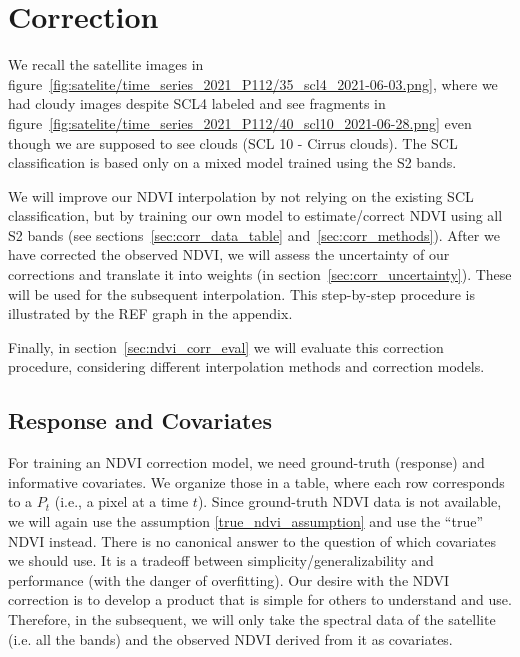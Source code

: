 \section{Correction}{
    \label{sec:corr_correction}
    {
        We recall the satellite images in figure~\ref{fig:satelite/time_series_2021_P112/35_scl4_2021-06-03.png}, where we had cloudy images despite SCL4 labeled and see fragments in figure~\ref{fig:satelite/time_series_2021_P112/40_scl10_2021-06-28.png} even though we are supposed to see clouds (SCL 10 - Cirrus clouds). The SCL classification is based only on a mixed model trained using the S2 bands.
        
        We will improve our NDVI interpolation by not relying on the existing SCL classification, but by training our own model to estimate/correct NDVI using all S2 bands (see sections~\ref{sec:corr_data_table} and~\ref{sec:corr_methods}). After we have corrected the observed NDVI, we will assess the uncertainty of our corrections and translate it into weights (in section~\ref{sec:corr_uncertainty}). These will be used for the subsequent interpolation. This step-by-step procedure is illustrated by the REF graph in the appendix.

        Finally, in section~\ref{sec:ndvi_corr_eval} we will evaluate this correction procedure, considering different interpolation methods and correction models.
    }

    \subsection{Response and Covariates}{
        \label{sec:corr_data_table}

        For training an NDVI correction model, we need ground-truth (response) and informative covariates. We organize those in a table, where each row corresponds to a $P_t$ (i.e., a pixel at a time $t$). 
        Since ground-truth NDVI data is not available, we will again use the assumption \ref{true_ndvi_assumption} and use the ``true'' NDVI instead. There is no canonical answer to the question of which covariates we should use. It is a tradeoff between simplicity/generalizability and performance (with the danger of overfitting). 
        Our desire with the NDVI correction is to develop a product that is simple for others to understand and use. Therefore, in the subsequent, we will only take the spectral data of the satellite (i.e. all the bands) and the observed NDVI derived from it as covariates. 
    }    

}
